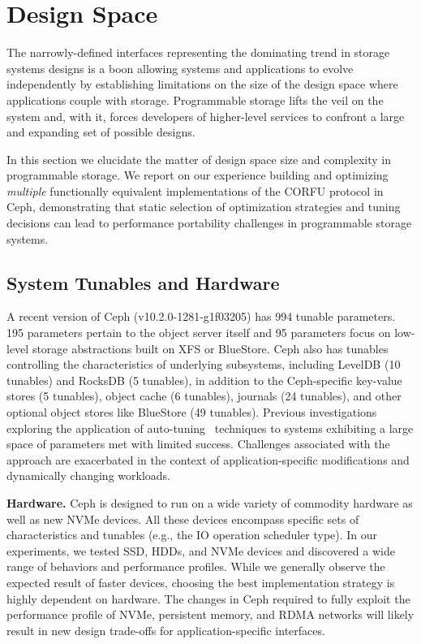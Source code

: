 \section{Design Space}
\label{sec:dspace}

The narrowly-defined interfaces representing the dominating trend in storage systems designs
is a boon allowing systems and applications to evolve independently by establishing limitations on the
size of the design space where applications couple with storage. Programmable
storage lifts the veil on the system and, with it, forces developers of higher-level services
to confront a large and expanding set of possible designs.

In this section we elucidate the matter of design space size and complexity in
programmable storage. We report on our experience building and optimizing
\emph{multiple} functionally equivalent implementations of the CORFU protocol
in Ceph, demonstrating that static selection of optimization strategies and tuning
decisions can lead to performance portability challenges in programmable
storage systems.

\subsection{System Tunables and Hardware}

A recent version of Ceph (v10.2.0-1281-g1f03205) has 994 tunable parameters.
195 parameters pertain to the object server itself and 95 parameters focus on
low-level storage abstractions built on XFS or BlueStore. Ceph also has
tunables controlling the characteristics of underlying subsystems, including LevelDB (10 tunables) and RocksDB (5
tunables), in addition to the Ceph-specific key-value stores (5 tunables), object cache (6
tunables), journals (24 tunables), and other optional object stores
like BlueStore (49 tunables).  Previous investigations exploring the application of 
auto-tuning~\cite{behzad:sc2013-autotuning} techniques to systems exhibiting a large space of parameters 
met with limited success. Challenges associated with the approach are exacerbated in the context of
application-specific modifications and dynamically changing workloads.

{\bf Hardware.} Ceph is designed to run on a wide variety of commodity
hardware as well as new NVMe devices. All these devices encompass specific sets of
characteristics and tunables (e.g., the IO operation scheduler type). In our
experiments, we tested SSD, HDDs, and NVMe devices and discovered a wide range of
behaviors and performance profiles. While we generally observe the expected
result of faster devices, choosing the best implementation strategy is highly dependent on hardware. The changes
in Ceph required to fully exploit the performance profile of NVMe, persistent
memory, and RDMA networks will likely result in new design trade-offs for
application-specific interfaces.

